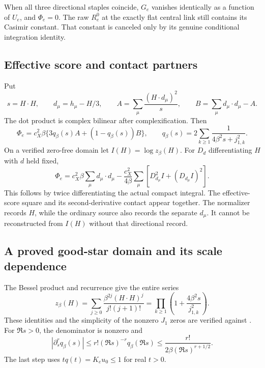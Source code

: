 \documentclass[11pt,letterpaper]{article}
\theoremstyle{remark}\newtheorem{remark}[theorem]{Remark}
\begin{document}
When all three directional staples coincide, \(G_e\) vanishes identically as a function of \(U_e\), and \(\Phi_e=0\). The raw \(R_e^0\) at the exactly flat central link still contains its Casimir constant. That constant is canceled only by its genuine conditional integration identity.

\subsection{Effective score and contact partners}

Put
\[
 s=H\cdot H,\qquad d_\mu=h_\mu-H/3,\qquad
 A=\sum_\mu\frac{(H\cdot d_\mu)^2}{s},\qquad
 B=\sum_\mu d_\mu\cdot d_\mu-A.
\]
The dot product is complex bilinear after complexification. Then
\begin{equation}\label{eq:starAB}
 \Phi_e=c_X^2\beta\{3q_\beta(s)A+(1-q_\beta(s))B\},
 \qquad
 q_\beta(s)=2\sum_{k\ge1}\frac1{4\beta^2s+j_{1,k}^2}.
\end{equation}
On a verified zero-free domain let \(I(H)=\log z_\beta(H)\). For \(D_d\) differentiating \(H\) with \(d\) held fixed,
\begin{equation}\label{eq:effective}
 \boxed{\quad
 \Phi_e
 =c_X^2\beta\sum_\mu d_\mu\cdot d_\mu
 -\frac{c_X^2}{4\beta}\sum_\mu
 \left[D_{d_\mu}^2I+(D_{d_\mu}I)^2\right].
 \quad}
\end{equation}
This follows by twice differentiating the actual compact integral. The effective-score square and its second-derivative contact appear together. The normalizer records \(H\), while the ordinary source also records the separate \(d_\mu\). It cannot be reconstructed from \(I(H)\) without that directional record.

\subsection{A proved good-star domain and its scale dependence}

The Bessel product and recurrence give the entire series
\[
 z_\beta(H)=
 \sum_{j\ge0}\frac{\beta^{2j}(H\cdot H)^j}{j!(j+1)!}
 =\prod_{k\ge1}\left(1+\frac{4\beta^2s}{j_{1,k}^2}\right).
\]
These identities and the simplicity of the nonzero \(J_1\) zeros are verified against \cite{DLMF}. For \(\Re s>0\), the denominator is nonzero and
\begin{equation}\label{eq:qjets}
 |\partial_s^r q_\beta(s)|
 \le r!(\Re s)^{-r}q_\beta(\Re s)
 \le \frac{r!}{2\beta(\Re s)^{r+1/2}}.
\end{equation}
The last step uses \(tq(t)=K_eu_0\le1\) for real \(t>0\).
\end{document}
